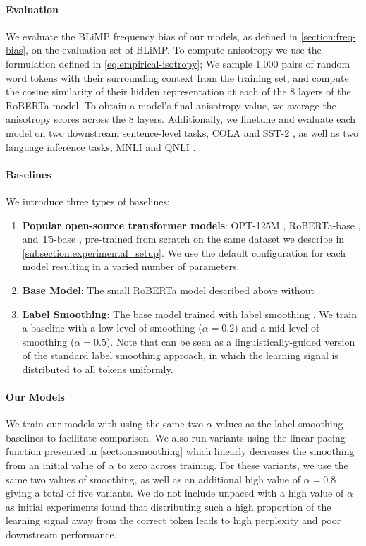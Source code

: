 \paragraph{Evaluation} We evaluate the BLiMP frequency bias of our models, as defined in \cref{section:freq-bias}, on the evaluation set of BLiMP. To compute anisotropy we use the formulation defined in \cref{eq:empirical-isotropy}; We sample 1,000 pairs of random word tokens with their surrounding context from the training set, and compute the cosine similarity of their hidden representation at each of the 8 layers of the RoBERTa model. To obtain a model's final anisotropy value, we average the anisotropy scores across the 8 layers. Additionally, we finetune and evaluate each model on two downstream sentence-level tasks, COLA \citep{warstadt2019cola} and SST-2 \citep{socher2013sst}, as well as two language inference tasks, MNLI \citep{williams2018mnli} and QNLI \citep{rajpurkar2016squad, wang2018glue}.


\paragraph{Baselines}

We introduce three types of baselines: 
\begin{enumerate}
    \item \textbf{Popular open-source transformer models}: OPT-125M \citep{zhang2022opt}, RoBERTa-base \citep{liu2019roberta}, and T5-base \citep{raffel2020t5}, pre-trained from scratch on the same dataset we describe in \cref{subsection:experimental_setup}. We use the default configuration for each model resulting in a varied number of parameters.
    \item \textbf{Base Model}: The small RoBERTa model described above without \smoothing.
    \item \textbf{Label Smoothing}: The base model trained with label smoothing \citep{szegedy2016rethinking}.  We train a baseline with a low-level of smoothing ($\alpha=0.2$) and a mid-level of smoothing ($\alpha=0.5$). Note that \smoothing can be seen as a linguistically-guided version of the standard label smoothing approach, in which the learning signal is distributed to all tokens uniformly.
\end{enumerate}


\paragraph{Our Models} We train our models with \smoothing using the same two $\alpha$ values as the label smoothing baselines to facilitate comparison. We also run variants using the linear pacing function presented in \cref{section:smoothing} which linearly decreases the smoothing from an initial value of $\alpha$ to zero across training. For these variants, we use the same two values of smoothing, as well as an additional high value of $\alpha=0.8$ giving a total of five \smoothing variants. We do not include unpaced \smoothing with a high value of $\alpha$ as initial experiments found that distributing such a high proportion of the learning signal away from the correct token leads to high perplexity and poor downstream performance.

